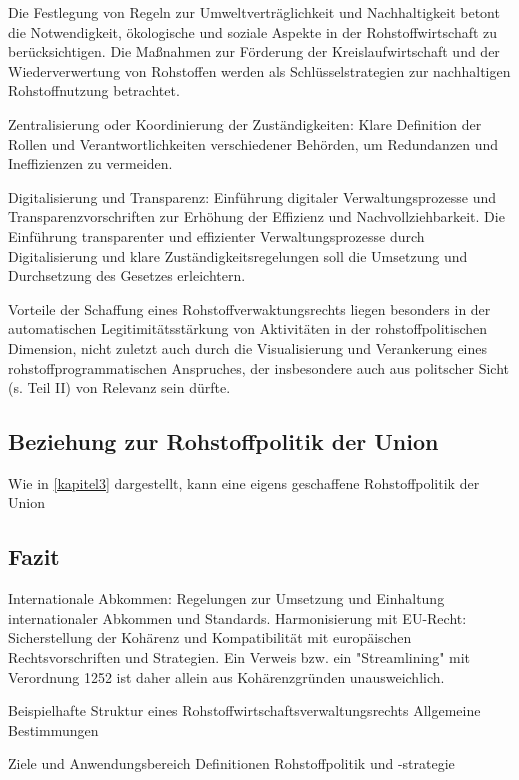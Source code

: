 Die Festlegung von Regeln zur Umweltverträglichkeit und Nachhaltigkeit betont die Notwendigkeit, ökologische und soziale Aspekte in der Rohstoffwirtschaft zu berücksichtigen.
Die Maßnahmen zur Förderung der Kreislaufwirtschaft und der Wiederverwertung von Rohstoffen werden als Schlüsselstrategien zur nachhaltigen Rohstoffnutzung betrachtet.

Zentralisierung oder Koordinierung der Zuständigkeiten: Klare Definition der Rollen und Verantwortlichkeiten verschiedener Behörden, um Redundanzen und Ineffizienzen zu vermeiden.

Digitalisierung und Transparenz: Einführung digitaler Verwaltungsprozesse und Transparenzvorschriften zur Erhöhung der Effizienz und Nachvollziehbarkeit.
Die Einführung transparenter und effizienter Verwaltungsprozesse durch Digitalisierung und klare Zuständigkeitsregelungen soll die Umsetzung und Durchsetzung des Gesetzes erleichtern.

Vorteile der Schaffung eines Rohstoffverwaktungsrechts liegen besonders in der automatischen Legitimitätsstärkung von Aktivitäten in der rohstoffpolitischen Dimension, nicht zuletzt auch durch die Visualisierung und Verankerung eines rohstoffprogrammatischen Anspruches, der insbesondere auch aus politscher Sicht (s. Teil II) von Relevanz sein dürfte.

\subsection{Beziehung zur Rohstoffpolitik der Union}
Wie in \ref{kapitel3} dargestellt, kann eine eigens geschaffene Rohstoffpolitik der Union 

\subsection{Fazit}



Internationale Abkommen: Regelungen zur Umsetzung und Einhaltung internationaler Abkommen und Standards.
Harmonisierung mit EU-Recht: Sicherstellung der Kohärenz und Kompatibilität mit europäischen Rechtsvorschriften und Strategien.
Ein Verweis bzw. ein "Streamlining" mit Verordnung 1252 ist daher allein aus Kohärenzgründen unausweichlich.

Beispielhafte Struktur eines Rohstoffwirtschaftsverwaltungsrechts
Allgemeine Bestimmungen

Ziele und Anwendungsbereich
Definitionen
Rohstoffpolitik und -strategie

